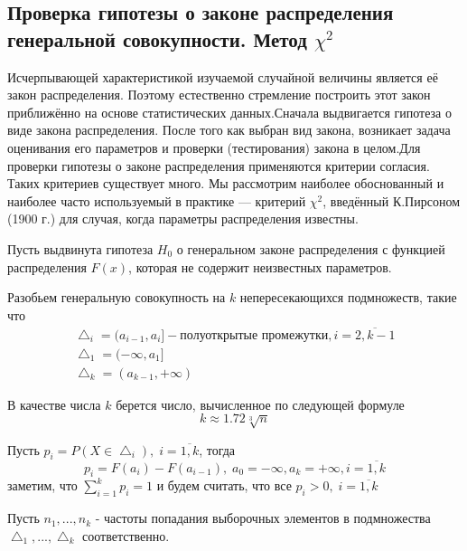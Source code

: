 \documentclass[a4paper, 12pt]{article}
\begin{document}
\subsection{Проверка гипотезы о законе распределения генеральной совокупности. Метод $\chi^2$}

Исчерпывающей характеристикой изучаемой случайной величины является её закон распределения. Поэтому естественно стремление построить этот закон приближённо на основе статистических данных.Сначала выдвигается гипотеза о виде закона распределения. После того как выбран вид закона, возникает задача оценивания его параметров и проверки (тестирования) закона в целом.Для проверки гипотезы о законе распределения применяются критерии согласия. Таких критериев существует много. Мы рассмотрим наиболее обоснованный и наиболее часто используемый в практике — критерий $\chi^2$, введённый К.Пирсоном (1900 г.) для случая, когда параметры
распределения известны.

Пусть выдвинута гипотеза $H_0$ о генеральном законе распределения с функцией распределения $F(x)$, которая не содержит неизвестных параметров. 

Разобьем генеральную совокупность на $k$ непересекающихся подмножеств, такие что
\begin{equation}
\begin{array}{c}
\bigtriangleup_i = (a_{i-1}, a_i] - \mbox{полуоткрытые промежутки}, i=\overline{2, k-1} \\
\bigtriangleup_1 = (-\infty, a_1] \\
\bigtriangleup_k = (a_{k-1}, + \infty)
\end{array}
\label{eq:3}
\end{equation}

В качестве числа $k$ берется число, вычисленное по следующей формуле
\begin{equation}
k \approx 1.72 \sqrt[3]{n}
\label{eq:4}
\end{equation}

Пусть $p_i = P(X \in \bigtriangleup_i), \; i = \overline{1,k}$, тогда
\begin{equation}
p_i = F(a_i) - F(a_{i-1}), \; a_0 = - \infty, a_k = + \infty, i = \overline{1,k}
\label{eq:5}
\end{equation}
заметим, что $\sum^k_{i=1} p_i = 1$ и будем считать, что все $p_i>0, \; i=\overline{1,k}$

Пусть $n_1,...,n_k$ - частоты попадания выборочных элементов в подмножества $\bigtriangleup_1,...,\bigtriangleup_k$ соответственно.
\end{document}
